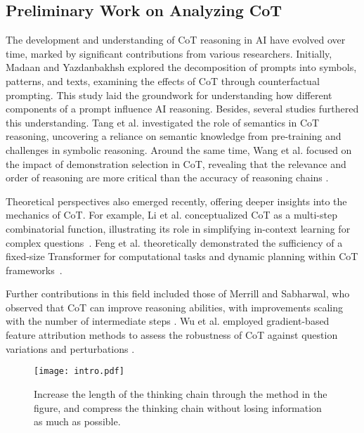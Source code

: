 \subsection{Preliminary Work on Analyzing CoT}
The development and understanding of CoT reasoning in AI have evolved over time, marked by significant contributions from various researchers. Initially, Madaan and Yazdanbakhsh \cite{madaan2022text} explored the decomposition of prompts into symbols, patterns, and texts, examining the effects of CoT through counterfactual prompting. This study laid the groundwork for understanding how different components of a prompt influence AI reasoning.
Besides, several studies furthered this understanding. Tang et al. \cite{tang2023large} investigated the role of semantics in CoT reasoning, uncovering a reliance on semantic knowledge from pre-training and challenges in symbolic reasoning. Around the same time, Wang et al. focused on the impact of demonstration selection in CoT, revealing that the relevance and order of reasoning are more critical than the accuracy of reasoning chains \cite{wang2023selfconsistency}.

Theoretical perspectives also emerged recently, offering deeper insights into the mechanics of CoT. For example, Li et al. conceptualized CoT as a multi-step combinatorial function, illustrating its role in simplifying in-context learning for complex questions~\cite{li2023dissecting}. Feng et al. theoretically demonstrated the sufficiency of a fixed-size Transformer for computational tasks and dynamic planning within CoT frameworks~\cite{fu2023complexitybased}.

Further contributions in this field included those of Merrill and Sabharwal, who observed that CoT can improve reasoning abilities, with improvements scaling with the number of intermediate steps \cite{merrill2023expressive}. Wu et al. employed gradient-based feature attribution methods to assess the robustness of CoT against question variations and perturbations \cite{wu2023analyzing}.

\begin{figure*}[ht]
    \centering
    \texttt{[image: intro.pdf]}
    \caption{Increase the length of the thinking chain through the method in the figure, and compress the thinking chain without losing information as much as possible.}
    \label{fig:intro}
\end{figure*}